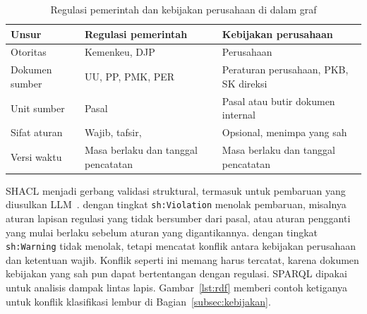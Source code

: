 \begin{table}[t]
\centering
\caption{Regulasi pemerintah dan kebijakan perusahaan di dalam graf}
\label{tab:setara}
\scriptsize
\begin{tabularx}{\columnwidth}{@{}P{1.5cm} L L@{}}
\toprule
\textbf{Unsur} & \textbf{Regulasi pemerintah} & \textbf{Kebijakan perusahaan} \\
\midrule
Otoritas & Kemenkeu, DJP & Perusahaan \\
Dokumen sumber & UU, PP, PMK, PER & Peraturan perusahaan, PKB, SK direksi \\
Unit sumber & Pasal & Pasal atau butir dokumen internal \\
Sifat aturan & Wajib, tafsir,  & Opsional, menimpa  yang sah \\
Versi waktu & Masa berlaku dan tanggal pencatatan & Masa berlaku dan tanggal pencatatan \\
\bottomrule
\end{tabularx}
\end{table}

SHACL menjadi gerbang validasi struktural, termasuk untuk pembaruan yang diusulkan LLM~\cite{knublauch2017shacl}.  dengan tingkat \texttt{sh:Violation} menolak pembaruan, misalnya aturan lapisan regulasi yang tidak bersumber dari pasal, atau aturan pengganti yang mulai berlaku sebelum aturan yang digantikannya.  dengan tingkat \texttt{sh:Warning} tidak menolak, tetapi mencatat konflik antara kebijakan perusahaan dan ketentuan wajib. Konflik seperti ini memang harus tercatat, karena dokumen kebijakan yang sah pun dapat bertentangan dengan regulasi. SPARQL dipakai untuk analisis dampak lintas lapis. Gambar~\ref{lst:rdf} memberi contoh ketiganya untuk konflik klasifikasi lembur di Bagian~\ref{subsec:kebijakan}.


